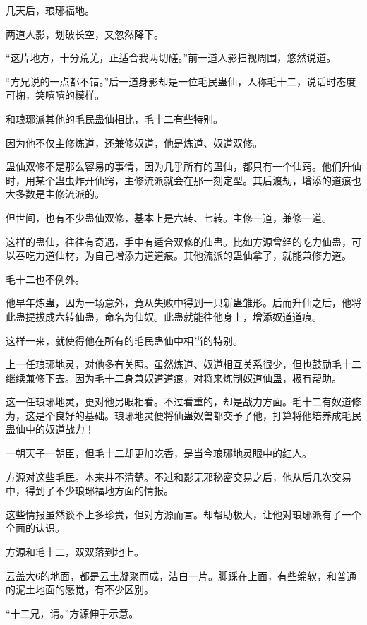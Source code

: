 
\begin{this_body}

几天后，琅琊福地。

两道人影，划破长空，又忽然降下。

“这片地方，十分荒芜，正适合我两切磋。”前一道人影扫视周围，悠然说道。

“方兄说的一点都不错。”后一道身影却是一位毛民蛊仙，人称毛十二，说话时态度可掬，笑嘻嘻的模样。

和琅琊派其他的毛民蛊仙相比，毛十二有些特别。

因为他不仅主修炼道，还兼修奴道，他是炼道、奴道双修。

蛊仙双修不是那么容易的事情，因为几乎所有的蛊仙，都只有一个仙窍。他们升仙时，用某个蛊虫炸开仙窍，主修流派就会在那一刻定型。其后渡劫，增添的道痕也大多数是主修流派的。

但世间，也有不少蛊仙双修，基本上是六转、七转。主修一道，兼修一道。

这样的蛊仙，往往有奇遇，手中有适合双修的仙蛊。比如方源曾经的吃力仙蛊，可以吞吃力道仙材，为自己增添力道道痕。其他流派的蛊仙拿了，就能兼修力道。

毛十二也不例外。

他早年炼蛊，因为一场意外，竟从失败中得到一只新蛊雏形。后而升仙之后，他将此蛊提拔成六转仙蛊，命名为仙奴。此蛊就能往他身上，增添奴道道痕。

这样一来，就使得他在所有的毛民蛊仙中相当的特别。

上一任琅琊地灵，对他多有关照。虽然炼道、奴道相互关系很少，但也鼓励毛十二继续兼修下去。因为毛十二身兼奴道道痕，对将来炼制奴道仙蛊，极有帮助。

这一任琅琊地灵，更对他另眼相看。不过看重的，却是战力方面。毛十二有奴道修为，这是个良好的基础。琅琊地灵便将仙蛊奴兽都交予了他，打算将他培养成毛民蛊仙中的奴道战力！

一朝天子一朝臣，但毛十二却更加吃香，是当今琅琊地灵眼中的红人。

方源对这些毛民。本来并不清楚。不过和影无邪秘密交易之后，他从后几次交易中，得到了不少琅琊福地方面的情报。

这些情报虽然谈不上多珍贵，但对方源而言。却帮助极大，让他对琅琊派有了一个全面的认识。

方源和毛十二，双双落到地上。

云盖大6的地面，都是云土凝聚而成，洁白一片。脚踩在上面，有些绵软，和普通的泥土地面的感觉，有不少区别。

“十二兄，请。”方源伸手示意。


\end{this_body}
